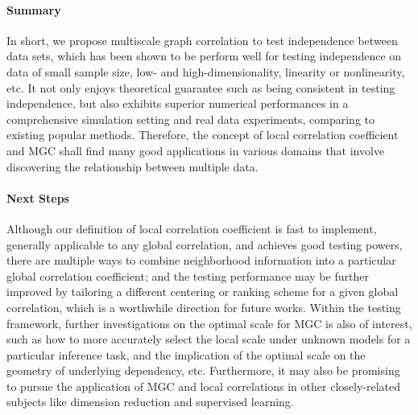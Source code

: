 \documentclass[11pt]{article}
\begin{document}
\paragraph{Summary}
In short, we propose multiscale graph correlation to test independence between data sets, which has been shown to be perform well for testing independence on data of small sample size, low- and high-dimensionality, linearity or nonlinearity, etc. It not only enjoys theoretical guarantee such as being consistent in testing independence, but also exhibits superior numerical performances in a comprehensive simulation setting and real data experiments, comparing to existing popular methods. Therefore, the concept of local correlation coefficient and MGC shall find many good applications in various domains that involve discovering the relationship between multiple data.  %

\paragraph{Next Steps}
Although our definition of local correlation coefficient is fast to implement, generally applicable to any global correlation, and achieves good testing powers, there are multiple ways to combine neighborhood information into a particular global correlation coefficient; and the testing performance may be further improved by tailoring a different centering or ranking scheme for a given global correlation, which is a worthwhile direction for future works. Within the testing framework, further investigations on the optimal scale for MGC is also of interest, such as how to more accurately select the local scale under unknown models for a particular inference task, and the implication of the optimal scale on the geometry of underlying dependency, etc. Furthermore, it may also be promising to pursue the application of MGC and local correlations in other closely-related subjects like dimension reduction and supervised learning. 

\end{document}
